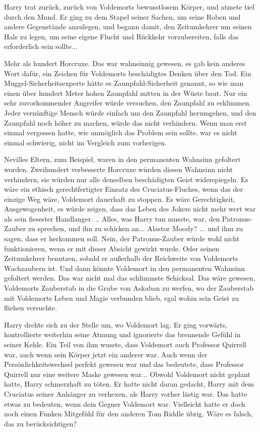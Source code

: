 Harry trat zurück, zurück von Voldemorts bewusstlosem Körper, und atmete tief
durch den Mund. Er ging zu dem Stapel seiner Sachen, um seine Roben und andere
Gegenstände anzulegen, und begann damit, den Zeitumkehrer um seinen Hals zu
legen, um seine eigene Flucht und Rückkehr vorzubereiten, falls das erforderlich
sein sollte...

Mehr als hundert Horcruxe. Das war wahnsinnig gewesen, es gab kein anderes Wort
dafür, ein Zeichen für Voldemorts beschädigtes Denken über den Tod. Ein
Muggel-Sicherheitsexperte hätte es Zaunpfahl-Sicherheit genannt, so wie man
einen über hundert Meter hohen Zaunpfahl mitten in der Wüste baut. Nur ein sehr
zuvorkommender Angreifer würde versuchen, den Zaunpfahl zu erklimmen. Jeder
vernünftige Mensch würde einfach um den Zaunpfahl herumgehen, und den Zaunpfahl
noch höher zu machen, würde das nicht verhindern. Wenn man erst einmal vergessen
hatte, wie unmöglich das Problem sein sollte, war es nicht einmal schwierig,
nicht im Vergleich zum vorherigen.

Nevilles Eltern, zum Beispiel, waren in den permanenten Wahnsinn gefoltert
worden. Zweihundert verbesserte Horcruxe würden diesen Wahnsinn nicht
verhindern, sie würden nur alle denselben beschädigten Geist widerspiegeln. Es
wäre ein ethisch gerechtfertigter Einsatz des Cruciatus-Fluches, wenn das der
einzige Weg wäre, Voldemort dauerhaft zu stoppen. Es wäre Gerechtigkeit,
Ausgewogenheit, es würde zeigen, dass das Leben des Jokers nicht mehr wert war
als sein fiesester Handlanger. .. Alles, was Harry tun musste, war, den
Patronus-Zauber zu sprechen, und ihn zu schicken an... Alastor Moody? ... und
ihm zu sagen, dass er herkommen soll. Nein, der Patronus-Zauber würde wohl nicht
funktionieren, wenn er mit dieser Absicht gewirkt wurde. Oder seinen
Zeitumkehrer benutzen, sobald er außerhalb der Reichweite von Voldemorts
Wachzaubern ist. Und dann könnte Voldemort in den permanenten Wahnsinn gefoltert
werden. Das war nicht mal das schlimmste Schicksal. Das wäre gewesen, Voldemorts
Zauberstab in die Grube von Askaban zu werfen, wo der Zauberstab mit Voldemorts
Leben und Magie verbunden blieb, egal wohin sein Geist zu fliehen versuchte.

Harry drehte sich zu der Stelle um, wo Voldemort lag. Er ging vorwärts,
kontrollierte weiterhin seine Atmung und ignorierte das brennende Gefühl in
seiner Kehle. Ein Teil von ihm wusste, dass Voldemort auch Professor Quirrell
war, auch wenn sein Körper jetzt ein anderer war. Auch wenn der
Persönlichkeitswechsel perfekt gewesen war und das bedeutete, dass Professor
Quirrell nur eine weitere Maske gewesen war... Obwohl Voldemort nicht geplant
hatte, Harry schmerzhaft zu töten. Er hatte nicht daran gedacht, Harry mit dem
Cruciatus seiner Anhänger zu verhexen, als Harry vorher lästig war. Das hatte
etwas zu bedeuten, wenn dein Gegner Voldemort war. Vielleicht hatte er doch noch
einen Funken Mitgefühl für den anderen Tom Riddle übrig. Wäre es falsch, das zu
berücksichtigen?

